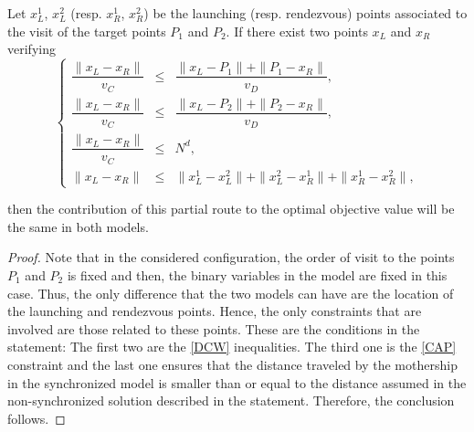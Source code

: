 \begin{theorem}
Let $x_L^1$, $x_L^2$ (resp. $x_R^1$, $x_R^2$) be the launching (resp. rendezvous) points associated to the visit of the target points $P_1$ and $P_2$. If there exist two points $x_L$ and $x_R$ verifying 
$$
 \left\{
 \begin{array}{ccl}
  \dfrac{\|x_L-x_R\|}{v_C} & \leq    & \dfrac{\|x_L - P_1\| + \|P_1 - x_R\|}{v_D}, \\
  \dfrac{\|x_L-x_R\|}{v_C} & \leq    & \dfrac{\|x_L - P_2\| + \|P_2 - x_R\|}{v_D}, \\
  \dfrac{\|x_L-x_R\|}{v_C} & \leq   & N^d, \\
  \|x_L-x_R\| & \leq & \|x_L^1 - x_L^2\| + \|x_L^2- x_R^1\| + \|x_R^1-x_R^2\|,
 \end{array}
 \right.
$$

\noindent then the contribution of this partial route to the optimal objective value will be the same in both models.
\end{theorem}

\begin{proof}
Note that in the considered configuration, the order of visit to the points $P_1$ and $P_2$ is fixed and then, the binary variables in the model are fixed in this case. Thus, the only difference that the two models can have are the location of the launching and rendezvous points. Hence, the only constraints that are involved are those related to these points. These are the conditions in the statement: The first two are the \eqref{DCW} inequalities. The third one is the \eqref{CAP} constraint and the last one ensures that the distance traveled by the mothership in the synchronized model is smaller than or equal to the distance assumed in the non-synchronized solution described in the statement. Therefore, the conclusion follows.

\end{proof}






